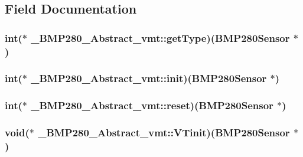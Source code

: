 \subsection{Field Documentation}
\hypertarget{struct___b_m_p280___abstract__vmt_a64e3f581ea5deda4b375cf539b18f7d5}{
\subsubsection[{get\-Type}]{\setlength{\rightskip}{0pt plus 5cm}int($\ast$ \-\_\-\-B\-M\-P280\-\_\-\-Abstract\-\_\-vmt\-::get\-Type)({\bf B\-M\-P280\-Sensor} $\ast$)}}\label{struct___b_m_p280___abstract__vmt_a64e3f581ea5deda4b375cf539b18f7d5}
\hypertarget{struct___b_m_p280___abstract__vmt_a36670528c4da556edc411db9edd3f36e}{
\subsubsection[{init}]{\setlength{\rightskip}{0pt plus 5cm}int($\ast$ \-\_\-\-B\-M\-P280\-\_\-\-Abstract\-\_\-vmt\-::init)({\bf B\-M\-P280\-Sensor} $\ast$)}}\label{struct___b_m_p280___abstract__vmt_a36670528c4da556edc411db9edd3f36e}
\hypertarget{struct___b_m_p280___abstract__vmt_a7c3c8f2aaf553fc88b3b14d21d0414e0}{
\subsubsection[{reset}]{\setlength{\rightskip}{0pt plus 5cm}int($\ast$ \-\_\-\-B\-M\-P280\-\_\-\-Abstract\-\_\-vmt\-::reset)({\bf B\-M\-P280\-Sensor} $\ast$)}}\label{struct___b_m_p280___abstract__vmt_a7c3c8f2aaf553fc88b3b14d21d0414e0}
\hypertarget{struct___b_m_p280___abstract__vmt_a6105891d25d684f266988326151bbd67}{
\subsubsection[{V\-Tinit}]{\setlength{\rightskip}{0pt plus 5cm}void($\ast$ \-\_\-\-B\-M\-P280\-\_\-\-Abstract\-\_\-vmt\-::\-V\-Tinit)({\bf B\-M\-P280\-Sensor} $\ast$)}}\label{struct___b_m_p280___abstract__vmt_a6105891d25d684f266988326151bbd67}


